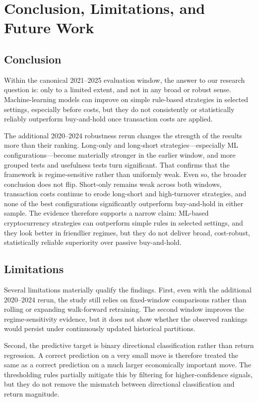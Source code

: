 \documentclass[12pt]{article}
\begin{document}
\section{Conclusion, Limitations, and Future Work}

\subsection{Conclusion}

Within the canonical 2021--2025 evaluation window, the answer to our research question is: only to a limited extent, and not in any broad or robust sense. Machine-learning models can improve on simple rule-based strategies in selected settings, especially before costs, but they do not consistently or statistically reliably outperform buy-and-hold once transaction costs are applied.

The additional 2020--2024 robustness rerun changes the strength of the results more than their ranking. Long-only and long-short strategies---especially ML configurations---become materially stronger in the earlier window, and more grouped tests and usefulness tests turn significant. That confirms that the framework is regime-sensitive rather than uniformly weak. Even so, the broader conclusion does not flip. Short-only remains weak across both windows, transaction costs continue to erode long-short and high-turnover strategies, and none of the best configurations significantly outperform buy-and-hold in either sample. The evidence therefore supports a narrow claim: ML-based cryptocurrency strategies can outperform simple rules in selected settings, and they look better in friendlier regimes, but they do not deliver broad, cost-robust, statistically reliable superiority over passive buy-and-hold.

\subsection{Limitations}

Several limitations materially qualify the findings. First, even with the additional 2020--2024 rerun, the study still relies on fixed-window comparisons rather than rolling or expanding walk-forward retraining. The second window improves the regime-sensitivity evidence, but it does not show whether the observed rankings would persist under continuously updated historical partitions.

Second, the predictive target is binary directional classification rather than return regression. A correct prediction on a very small move is therefore treated the same as a correct prediction on a much larger economically important move. The thresholding rules partially mitigate this by filtering for higher-confidence signals, but they do not remove the mismatch between directional classification and return magnitude.
\end{document}
